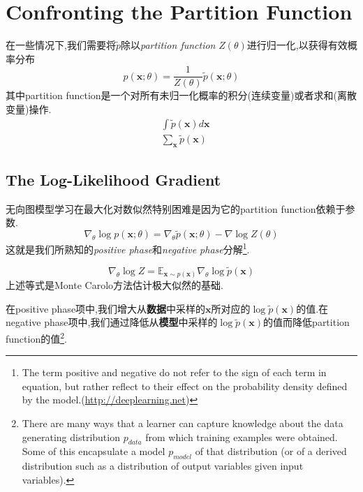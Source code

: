 \chapter{Confronting the Partition Function}\label{ch:partition_function}

在一些情况下,我们需要将$\tilde p$除以\textit{partition function} $Z(\theta)$进行归一化,以获得有效概率分布
\begin{equation}
p(\mathbf x;\theta)=\frac{1}{Z(\theta)}\tilde p(\mathbf x;\theta)
\end{equation}
其中partition function是一个对所有未归一化概率的积分(连续变量)或者求和(离散变量)操作.
\begin{equation}\begin{split}
&\int\tilde p(\mathbf x)d\mathbf x\\
&\sum_{\mathbf x}\tilde p(\mathbf x)
\end{split}\end{equation}

\section{The Log-Likelihood Gradient}

无向图模型学习在最大化对数似然特别困难是因为它的partition function依赖于参数.
\begin{equation}
\nabla_\theta\log p(\mathbf x;\theta)=\nabla_\theta\tilde p(\mathbf x;\theta)-\nabla\log Z(\theta)
\end{equation}
这就是我们所熟知的\textit{positive phase}和\textit{negative phase}分解\footnote{The term positive and negative do not refer to the sign of each term in equation, but rather reflect to their effect on the probability density defined by the model.(\href{http://deeplearning.net/tutorial/rbm.html\#rbm}{http://deeplearning.net})}.

\begin{equation}\label{eq:gradient_of_log_partition_function}
\nabla_\theta\log Z=\mathbb E_{\mathbf x\sim p(\mathbf x)}\nabla_\theta\log\tilde p(\mathbf x)
\end{equation}
上述等式是Monte Carolo方法估计极大似然的基础.

在positive phase项中,我们增大从\textbf{数据}中采样的$\mathbf x$所对应的$\log\tilde p(\mathbf x)$的值.在negative phase项中,我们通过降低从\textbf{模型}中采样的$\log\tilde p(\mathbf x)$的值而降低partition function的值\footnote{There are many ways that a learner can capture knowledge about the data generating distribution $p_{data}$ from which training examples were obtained. Some of this encapsulate a model $p_{model}$ of that distribution (or of a derived distribution such as a distribution of output variables given input variables).}.

